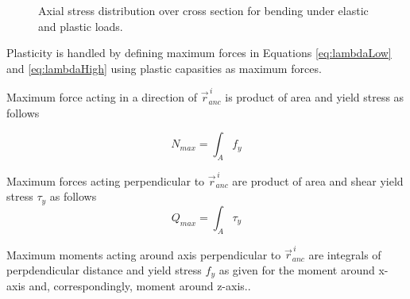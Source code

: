 \begin{figure}[htb!]
\centering
{}
\hspace{1cm}
\caption{Axial stress distribution over cross section for bending under elastic and plastic loads.}
\label{fig:wp}
\end{figure}

Plasticity is handled by defining maximum forces
in Equations \ref{eq:lambdaLow} and  
\ref{eq:lambdaHigh} using plastic capasities as maximum forces.

Maximum force acting in a direction of $\vec{r}_{anc}^{\,i} $
is product of area and yield stress as follows

\begin{equation} \label{eq:fN}
N_{max}= \int_A f_y
\end{equation}

Maximum forces acting perpendicular to $\vec{r}_{anc}^{\,i} $
are product of area and shear yield stress $\tau_y$ as follows
\begin{equation} \label{eq:fQ}
Q_{max}= \int_A \tau_y
\end{equation}

Maximum moments acting around axis perpendicular to $\vec{r}_{anc}^{\,i} $
are integrals of perpdendicular distance 
and yield stress $f_y$ as given for the moment around x-axis and,
correspondingly, moment around z-axis..

